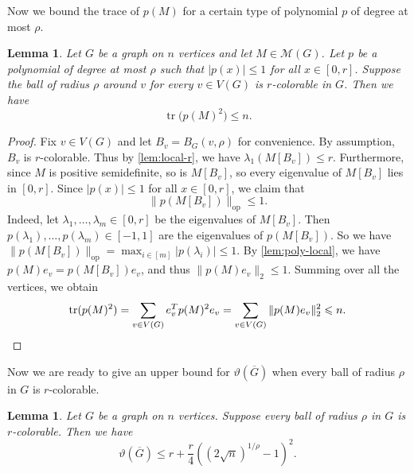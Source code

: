 \documentclass[reqno]{amsart}
\newtheorem{lemma}[theorem]{Lemma}
\theoremstyle{remark}
\theoremstyle{definition}
\numberwithin{theorem}{section}
\newcommand{\cM}{\mathcal M}
\renewcommand{\le}{\leqslant}
\newcommand{\Tr}{\operatorname{tr}}
\newcommand{\ov}[1]{\overline{#1}}
\begin{document}
Now we bound the trace of $p(M)$ for a certain type of polynomial $p$ of degree at most $\rho$.

\begin{lemma}\label{lem:trace}
Let $G$ be a graph on $n$ vertices and let $M\in \cM(G)$. Let $p$ be a polynomial of degree at most $\rho$ such that $|p(x)|\le 1$ for all $x\in [0,r]$. Suppose the ball of radius $\rho$ around $v$ for every $v\in V(G)$ is $r$-colorable in $G$. Then we have
\[ \Tr\bigl(p(M)^2\bigr)\le n.\]
\end{lemma}

\begin{proof}
Fix $v\in V(G)$ and let $B_v=B_G(v,\rho)$ for convenience. By assumption, $B_v$ is $r$-colorable. Thus by \cref{lem:local-r}, we have $\lambda_1(M[B_v])\le r$.
Furthermore, since $M$ is positive semidefinite, so is $M[B_v]$, so every eigenvalue of $M[B_v]$ lies in $[0,r]$.  Since $|p(x)|\le 1$ for all $x\in [0,r]$, we claim that \[\|p(M[B_v])\|_{\mathrm{op}}\le 1.\] 
Indeed, let $\lambda_1,\dots, \lambda_m\in [0,r]$ be the eigenvalues of $M[B_v]$. Then $p(\lambda_1),\dots, p(\lambda_m)\in [-1,1]$ are the eigenvalues of $p(M[B_v])$. So we have $\|p(M[B_v])\|_{\mathrm{op}} = \max_{i\in [m]} |p(\lambda_i)|\le 1$.
By \cref{lem:poly-local}, we have $p(M)e_v=p(M[B_v])e_v$, and thus $\|p(M)e_v\|_2\le 1$.
Summing over all the vertices, we obtain
\[\Tr(p(M)^2)=\sum_{v\in V(G)}e_v^Tp(M)^2e_v=\sum_{v\in V(G)}\|p(M)e_v\|_2^2\le n.\qedhere\]
\end{proof}

Now we are ready to give an upper bound for $\vartheta(\ov G)$ when every ball of radius $\rho$ in $G$ is $r$-colorable.

\begin{lemma}\label{lem:cheb}
Let $G$ be a graph on $n$ vertices. Suppose every ball of radius $\rho$ in $G$ is $r$-colorable. Then we have
\[
\vartheta(\ov G)\le r + \frac{r}{4}((2\sqrt{n})^{1/\rho}-1)^2.
\]
\end{lemma}
\end{document}
